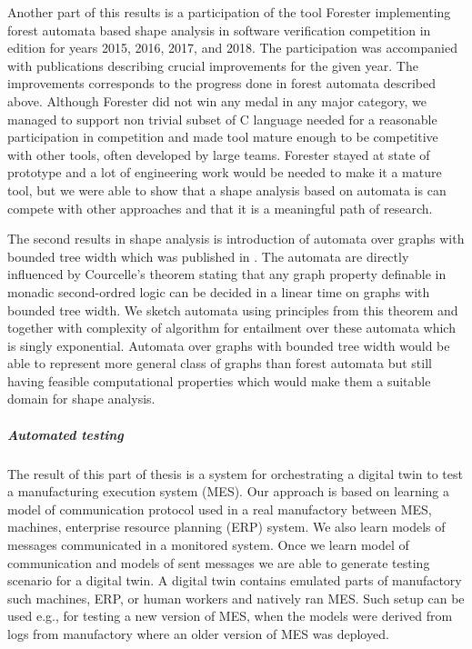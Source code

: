 Another part of this results is a participation of the tool Forester
implementing forest automata based shape analysis
in software verification competition in edition for years 2015, 2016, 2017, and 2018.
The participation was accompanied with publications \cite{svcomp16-forester,holik_run_2016,holik_forester_2017}
describing crucial improvements for the given year.
The improvements corresponds to the progress done in forest automata described above.
Although Forester did not win any medal in any major category,
we managed to support non trivial subset of C language needed for a reasonable
participation in competition and made tool mature enough to be competitive with
other tools, often developed by large teams.
Forester stayed at state of prototype and a lot of engineering work would be needed to make
it a mature tool, but we were able to show that a shape analysis based on automata is
can compete with other approaches and that it is a meaningful path of research.


The second results in shape analysis is introduction of automata over graphs
with bounded tree width which was published in \cite{netys21}.
The automata are directly influenced by Courcelle's theorem \cite{courcell_graph_2012}
stating that any graph property definable in monadic second-ordred logic can be decided
in a linear time on graphs with bounded tree width.
We sketch automata using principles from this theorem and together with complexity
of algorithm for entailment over these automata which is singly exponential.
Automata over graphs with bounded tree width would be able to represent
more general class of graphs than forest automata but still having feasible computational
properties which would make them a suitable domain for shape analysis.

\subparagraph{Automated testing}
The result of this part of thesis is a system for orchestrating a digital twin to
test a manufacturing execution system (MES).
Our approach is based on learning a model of communication protocol used in a real manufactory between
MES, machines, enterprise resource planning (ERP) system.
We also learn models of messages communicated in a monitored system.
Once we learn model of communication and models of sent messages we are able
to generate testing scenario for a digital twin.
A digital twin contains emulated parts of manufactory such machines, ERP, or human workers and
natively ran MES.
Such setup can be used e.g., for testing a new version of MES, when the models were derived
from logs from manufactory where an older version of MES was deployed.

